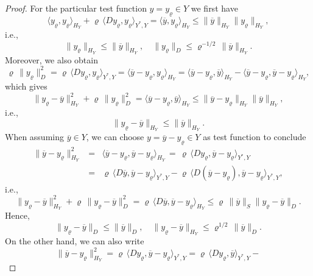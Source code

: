 \documentclass{article}
\numberwithin{equation}{section}
\begin{document}
\begin{proof}
  For the particular test function $y = y_\varrho \in Y$ we first have
  \[
    \langle y_\varrho , y_\varrho \rangle_{H_Y} +
    \varrho \, \langle D y_\varrho , y_\varrho  \rangle_{Y^*,Y} =
    \langle \overline{y} , y_\varrho \rangle_{H_Y} \leq
    \| \overline{y} \|_{H_Y} \| y_\varrho \|_{H_Y},
  \]
  i.e.,
  \[
    \| y_\varrho \|_{H_Y} \leq \| \overline{y} \|_{H_Y} , \quad
    \| y_\varrho \|_D \leq \varrho^{-1/2} \, \| \overline{y} \|_{H_Y} .
  \]
  Moreover, we also obtain
  \[
    \varrho \, \| y_\varrho \|_D^2 =
    \varrho \, \langle D y_\varrho , y_\varrho \rangle_{Y^*,Y} =
    \langle \overline{y} - y_\varrho , y_\varrho \rangle_{H_Y} =
    \langle \overline{y} - y_\varrho , \overline{y} \rangle_{H_Y} -
    \langle \overline{y} - y_\varrho , \overline{y} - y_\varrho \rangle_{H_Y},
  \]
  which gives
  \[
    \| y_\varrho - \overline{y} \|_{H_Y}^2 + \varrho \, \| y_\varrho \|^2_D =
    \langle \overline{y} - y_\varrho , \overline{y} \rangle_{H_Y} \leq
    \| \overline{y} - y_\varrho \|_{H_Y} \| \overline{y} \|_{H_Y} ,
  \]
  i.e.,
  \[
    \| y_\varrho - \overline{y} \|_{H_Y} \leq \| \overline{y} \|_{H_Y}.
  \]
  When assuming $\overline{y} \in Y$, we can choose
  $y = \overline{y} - y_\varrho \in Y$ as test function to conclude
  \begin{eqnarray*}
    \| \overline{y} - y_\varrho \|^2_{H_Y}
    & = & \langle \overline{y} - y_\varrho , \overline{y} - y_\varrho
          \rangle_{H_Y} \, = \,
          \varrho \, \langle D y_\varrho ,
          \overline{y} - y_\varrho \rangle_{Y^*,Y} \\
    & = & \varrho \, \langle D \overline{y} , \overline{y} - y_\varrho
          \rangle_{Y^*,Y} - \varrho \, \langle D (\overline{y} - y_\varrho),
          \overline{y} - y_\varrho \rangle_{Y^*,Y},
  \end{eqnarray*}
  i.e.,
  \[
    \| y_\varrho - \overline{y} \|_{H_Y}^2 + \varrho \,
    \| y_\varrho - \overline{y} \|_D^2 =
    \varrho \, \langle D \overline{y} , \overline{y} - y_\varrho \rangle_{H_Y}
    \leq
    \varrho \, \| \overline{y} \|_S \| y_\varrho - \overline{y} \|_D .
  \]
  Hence,
  \[
    \| y_\varrho - \overline{y} \|_D \leq \| \overline{y} \|_D , \quad
    \| y_\varrho - \overline{y} \|_{H_Y} \leq \varrho^{1/2} \,
    \| \overline{y} \|_D .
  \]
  On the other hand, we can also write
  \[
    \| \overline{y} - y_\varrho \|^2_{H_Y}
    =
    \varrho \, \langle D y_\varrho ,
    \overline{y} - y_\varrho \rangle_{Y^*,Y} =
    \varrho \, \langle D y_\varrho , \overline{y} \rangle_{Y^*,Y} -
\]
\end{proof}
\end{document}
